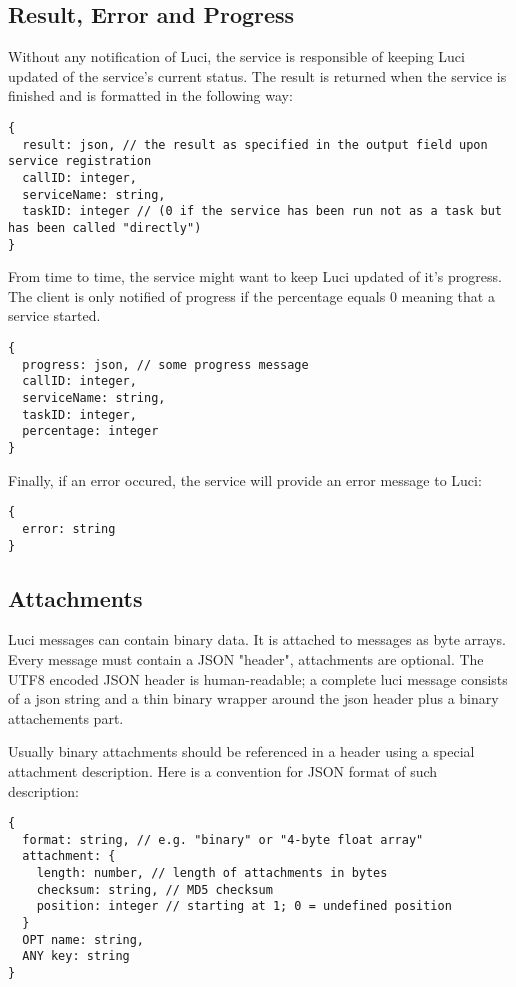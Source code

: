 \subsection{Result, Error and Progress}
Without any notification of Luci, the service is responsible of keeping Luci updated of the service's current status. The result is returned when the service is finished and is formatted in the following way:

\begin{lstlisting}
{
  result: json, // the result as specified in the output field upon service registration
  callID: integer,
  serviceName: string,
  taskID: integer // (0 if the service has been run not as a task but has been called "directly")
}
\end{lstlisting}

From time to time, the service might want to keep Luci updated of it's progress. The client is only notified of progress if the percentage equals 0 meaning that a service started.
\begin{lstlisting}
{
  progress: json, // some progress message
  callID: integer,
  serviceName: string,
  taskID: integer,
  percentage: integer
}
\end{lstlisting}

Finally, if an error occured, the service will provide an error message to Luci:
\begin{lstlisting}
{
  error: string
}
\end{lstlisting}

\subsection{Attachments}

Luci messages can contain binary data. It is attached to messages as byte arrays. Every message must contain a JSON "header", attachments are optional. The UTF8 encoded JSON header is human-readable; a complete luci message consists of a json string and a thin binary wrapper around the json header plus a binary attachements part.

Usually binary attachments should be referenced in a header using a special attachment description. Here is a convention for JSON format of such description:

\begin{lstlisting}
{
  format: string, // e.g. "binary" or "4-byte float array"
  attachment: {
    length: number, // length of attachments in bytes
    checksum: string, // MD5 checksum
    position: integer // starting at 1; 0 = undefined position
  }
  OPT name: string,
  ANY key: string
}
\end{lstlisting}


